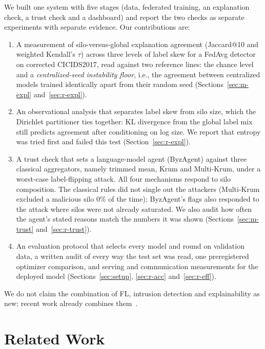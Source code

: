 \documentclass[conference]{IEEEtran}
\begin{document}
We built one system with five stages (data, federated training, an explanation check, a
trust check and a dashboard) and report the two checks as separate experiments with
separate evidence. Our contributions are:
\begin{enumerate}
\item A measurement of silo-versus-global explanation agreement (Jaccard@10 and weighted
Kendall's $\tau$) across three levels of label skew for a FedAvg detector on corrected
CICIDS2017, read against two reference lines: the chance level and a
\emph{centralized-seed instability floor}, i.e., the agreement between centralized models
trained identically apart from their random seed
(Sections~\ref{sec:m-expl} and~\ref{sec:r-expl}).
\item An observational analysis that separates label skew from silo size, which the
Dirichlet partitioner ties together: KL divergence from the global label mix still
predicts agreement after conditioning on log size. We report that entropy was tried
first and failed this test (Section~\ref{sec:r-expl}).
\item A trust check that sets a language-model agent (ByzAgent) against three classical
aggregators, namely trimmed mean, Krum and Multi-Krum, under a worst-case label-flipping
attack.
All four mechanisms respond to silo composition. The classical rules did not single out
the attackers (Multi-Krum excluded a malicious silo 0\% of the time); ByzAgent's flags %
also responded to the attack where silos were not already saturated. We also audit how
often the agent's stated reasons match the numbers it was shown
(Sections~\ref{sec:m-trust} and~\ref{sec:r-trust}).
\item An evaluation protocol that selects every model and round on validation data, a
written audit of every way the test set was read, one preregistered optimizer
comparison, and serving and communication measurements for the deployed model
(Sections~\ref{sec:setup}, \ref{sec:r-acc} and~\ref{sec:r-eff}).
\end{enumerate}
We do not claim the combination of FL, intrusion detection and explainability as new;
recent work already combines
them~\cite{dong2022fedforest,thi2023xfedhunter,bilal2025,gholamrezazadeh2026}.

\section{Related Work}
\end{document}
